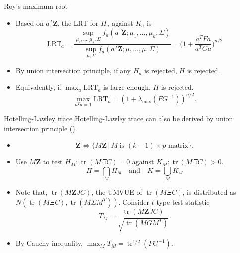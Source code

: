 \documentclass{beamer}
\DeclareMathOperator{\mytr}{tr}
\newcommand{\bZ}{\mathbf{Z}}
\theoremstyle{plain}
\theoremstyle{definition}
\theoremstyle{remark}
\begin{document}
\begin{frame}{Roy's maximum root}

    \begin{itemize}
        \item
    Based on $a^T \bZ$, the LRT for $H_a$ against $K_a$ is
    $$
    \text{LRT}_a=\frac{\sup\limits_{\mu_1,\ldots,\mu_k,\Sigma} f_a(a^T \bZ ;\mu_1,\ldots,\mu_k,\Sigma)}{\sup\limits_{\mu,\Sigma} f_a(a^T \bZ ;\mu,\ldots,\mu,\Sigma)}=\Big(1+\frac{a^T F a}{a^T G a}\Big)^{n/2}
    $$
        \item
    By union intersection principle, if any $H_a$ is rejected, $H$ is rejected.
        \item
            Equivalently, if $\max_{a} \text{LRT}_a$ is large enough, $H$ is rejected.
    $$
    \max\limits_{a^T a=1}\text{LRT}_a=(1+\lambda_{\max}(FG^{-1}))^{n/2}.
    $$
    \end{itemize} 
\end{frame}
\begin{frame}{Hotelling-Lawley trace}
    Hotelling-Lawley trace can also be derived by union intersection principle (\cite{Mudholkar1974}).
    \begin{itemize}
        \item
            $$\bZ \Longleftrightarrow \big\{M \bZ \,|\, M \text{ is $(k-1)\times p$ matrix}\big\}.$$
        \item
            Use $M \bZ$ to test $H_{M}:\mytr (M\Xi C)=0$ against $K_M:\mytr (M\Xi C)>0$.
            $$
            H=\bigcap_M H_M\quad \text{and}\quad K=\bigcup_M K_M
            $$
        \item
            Note that, $\mytr(M\bZ J C)$, the UMVUE of $\mytr(M\Xi C)$, is distributed as $N(\mytr(M\Xi C),\mytr(M\Sigma M^T))$. Consider $t$-type test statistic
            $$
            T_M=\frac{\mytr(M\bZ JC)}{\sqrt{\mytr(MG M^T)}}.
            $$
        \item
            By Cauchy inequality, $\max_M T_M=\mytr^{1/2}(FG^{-1})$.
    \end{itemize}

\end{frame}
\end{document}
